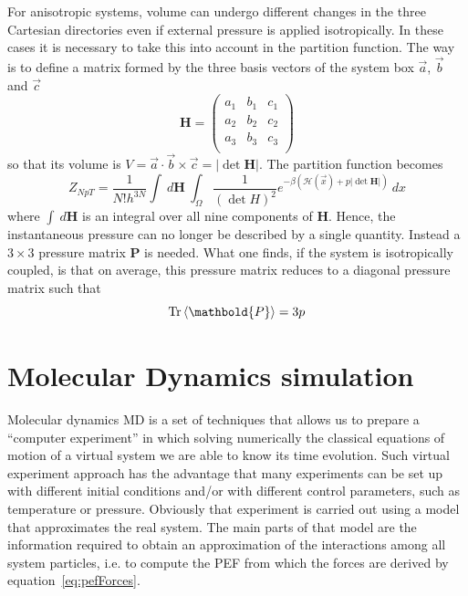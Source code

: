 For anisotropic systems, volume can undergo different changes in the three Cartesian directories even if external
pressure is applied isotropically. In these cases it is necessary to take this into account in the partition
function. The way is to define a matrix formed by the three basis vectors of the system box $\vec a$, $\vec b$
and $\vec c$
\begin{equation}
	 \mathbold{H} =
	\begin{pmatrix}
		a_1 & b_1 & c_1 \\
		a_2 & b_2 & c_2 \\
		a_3 & b_3 & c_3 \\
	\end{pmatrix}
	\label{eq:volumeMatrix}
\end{equation}
so that its volume is $V = \vec a\cdot \vec b\times \vec c = |\det{ \mathbold{H}}|$. The partition function becomes
\begin{equation*}
	Z_{NpT} = \frac{1}{N!h^{3N}}\int\ d \mathbold{H} \ \int_\Omega \frac{1}{(\det{H})^2} e^{-\beta(\mathcal{H}(\vec x) + p|\det{ \mathbold{H}}|)}\ dx
\end{equation*}
where $\int\ d\mathbold{H}$ is an integral over all nine components of $\mathbold{H}$. Hence, the instantaneous
pressure can no longer be described by a single quantity. Instead a $3\times 3$ pressure matrix $ \mathbold{P}$
is needed. What one finds, if the system is isotropically coupled, is that on average, this pressure matrix
reduces to a diagonal pressure matrix such that
\begin{equation*}
	\text{Tr}\ave{ \mathbold{P}} = 3p
\end{equation*}

\newpage
\section{Molecular Dynamics simulation}
\label{sec:MD}
Molecular dynamics \ac{MD} is a set of techniques that allows us to prepare a ``computer experiment'' in which 
solving numerically the classical equations of motion of a virtual system we are able to know its time evolution. 
Such virtual experiment approach has the advantage that many experiments can be set up with different initial 
conditions and/or with different control parameters, such as temperature or pressure. Obviously that experiment is 
carried out using a model that approximates the real system. The main parts of that model are the information 
required to obtain an approximation of the interactions among all system particles, i.e. to compute the \ac{PEF} 
from which the forces are derived by equation~\eqref{eq:pefForces}.

